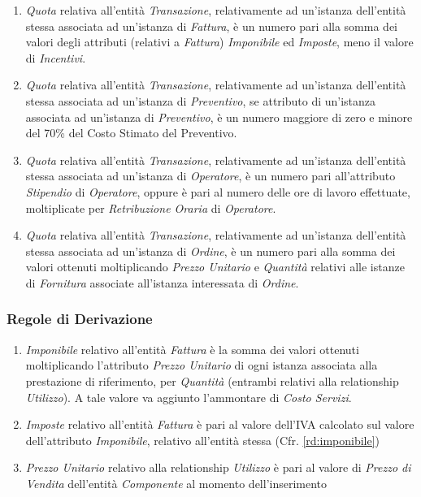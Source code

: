 \begin{enumerate}
				\item \emph{Quota} relativa all'entità \emph{Transazione}, relativamente ad un'istanza dell'entità stessa associata ad un'istanza di \emph{Fattura}, è un numero pari alla somma dei valori degli attributi (relativi a \emph{Fattura}) \emph{Imponibile} ed \emph{Imposte}, meno il valore di \emph{Incentivi}.
				\item \emph{Quota} relativa all'entità \emph{Transazione}, relativamente ad un'istanza dell'entità stessa associata ad un'istanza di \emph{Preventivo}, se attributo di un'istanza associata ad un'istanza di \emph{Preventivo}, è un numero maggiore di zero e minore del 70\% del Costo Stimato del Preventivo.
				\item \emph{Quota} relativa all'entità \emph{Transazione}, relativamente ad un'istanza dell'entità stessa associata ad un'istanza di \emph{Operatore}, è un numero pari all'attributo \emph{Stipendio} di \emph{Operatore}, oppure è pari al numero delle ore di lavoro effettuate, moltiplicate per \emph{Retribuzione Oraria} di \emph{Operatore}.
				\item \emph{Quota} relativa all'entità \emph{Transazione}, relativamente ad un'istanza dell'entità stessa associata ad un'istanza di \emph{Ordine}, è un numero pari alla somma dei valori ottenuti moltiplicando \emph{Prezzo Unitario} e \emph{Quantità} relativi alle istanze di \emph{Fornitura} associate all'istanza interessata di \emph{Ordine}.

			\end{enumerate}
		
		\subsubsection{Regole di Derivazione}
		
			{\color{red}{Da correggere di qui in poi.}}
			\begin{enumerate}

				\item \label{rd:imponibile} \emph{Imponibile} relativo all'entità \emph{Fattura} è la somma dei valori ottenuti moltiplicando l'attributo \emph{Prezzo Unitario} di ogni istanza associata alla prestazione di riferimento, per \emph{Quantità} (entrambi relativi alla relationship \emph{Utilizzo}). A tale valore va aggiunto l'ammontare di \emph{Costo Servizi}.

				\item \label{rd:imposte} \emph{Imposte} relativo all'entità \emph{Fattura} è pari al valore dell'IVA calcolato sul valore dell'attributo \emph{Imponibile}, relativo all'entità stessa (Cfr. \ref{rd:imponibile})

				\item \label{rd:prezzo_unitario} \emph{Prezzo Unitario} relativo alla relationship \emph{Utilizzo} è pari al valore di \emph{Prezzo di Vendita} dell'entità \emph{Componente} al momento dell'inserimento
				
			\end{enumerate}
